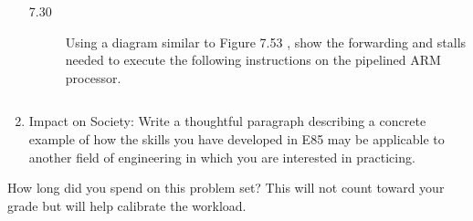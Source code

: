 \documentclass{ps}
\begin{document}
\begin{enumerate}
  \begin{description}
  \item[7.30] Using a diagram similar to Figure 7.53 \figurebelow,
    show the forwarding and stalls needed to execute the following
    instructions on the pipelined ARM processor.

    \inputminted{text}{code/ddca-7.30.arm}

    \begin{solution}
    \end{solution}
  \end{description}

\item Impact on Society: Write a thoughtful paragraph describing a
  concrete example of how the skills you have developed in E85 may be
  applicable to another field of engineering in which you are
  interested in practicing.

  \begin{solution}
  \end{solution}
\end{enumerate}

How long did you spend on this problem set?  This will not count
toward your grade but will help calibrate the workload.
\begin{solution}
\end{solution}
\end{document}

